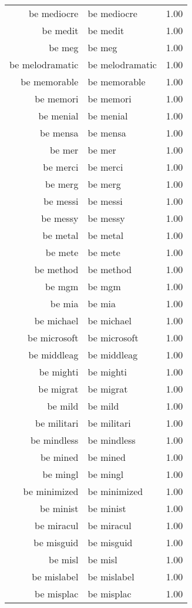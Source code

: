 \begin{table}[ht]
\begin{tabular}{rlr}
  be mediocre & be mediocre & 1.00 \\ 
  be medit & be medit & 1.00 \\ 
  be meg & be meg & 1.00 \\ 
  be melodramatic & be melodramatic & 1.00 \\ 
  be memorable & be memorable & 1.00 \\ 
  be memori & be memori & 1.00 \\ 
  be menial & be menial & 1.00 \\ 
  be mensa & be mensa & 1.00 \\ 
  be mer & be mer & 1.00 \\ 
  be merci & be merci & 1.00 \\ 
  be merg & be merg & 1.00 \\ 
  be messi & be messi & 1.00 \\ 
  be messy & be messy & 1.00 \\ 
  be metal & be metal & 1.00 \\ 
  be mete & be mete & 1.00 \\ 
  be method & be method & 1.00 \\ 
  be mgm & be mgm & 1.00 \\ 
  be mia & be mia & 1.00 \\ 
  be michael & be michael & 1.00 \\ 
  be microsoft & be microsoft & 1.00 \\ 
  be middleag & be middleag & 1.00 \\ 
  be mighti & be mighti & 1.00 \\ 
  be migrat & be migrat & 1.00 \\ 
  be mild & be mild & 1.00 \\ 
  be militari & be militari & 1.00 \\ 
  be mindless & be mindless & 1.00 \\ 
  be mined & be mined & 1.00 \\ 
  be mingl & be mingl & 1.00 \\ 
  be minimized & be minimized & 1.00 \\ 
  be minist & be minist & 1.00 \\ 
  be miracul & be miracul & 1.00 \\ 
  be misguid & be misguid & 1.00 \\ 
  be misl & be misl & 1.00 \\ 
  be mislabel & be mislabel & 1.00 \\ 
  be misplac & be misplac & 1.00 \\ 

\end{tabular}
\end{table}
